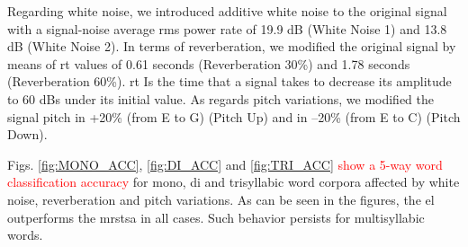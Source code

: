 \documentclass[10pt,letterpaper]{article}
\begin{document}
\pagebreak

Regarding white noise, we introduced additive white noise to the original signal with a signal-noise average \gls{rms} power rate of 19.9 dB (White Noise 1) and 13.8 dB (White Noise 2). In terms of reverberation, we modified the original signal by means of \gls{rt} values of 0.61 seconds (Reverberation 30\%) and 1.78 seconds (Reverberation 60\%). \gls{rt} Is the time that a signal takes to decrease its amplitude to 60 dBs under its initial value. As regards pitch variations, we modified the signal pitch in +20\% (from E to G) (Pitch Up) and in --20\% (from E to C) (Pitch Down).

Figs. \ref{fig:MONO_ACC}, \ref{fig:DI_ACC} and \ref{fig:TRI_ACC}
\textcolor{red}{show a 5-way word classification accuracy} for mono, di and trisyllabic word corpora affected by
white noise, reverberation and pitch variations.
As can be seen in the figures, the \gls{el} outperforms the \gls{mrstsa} in all cases.
Such behavior persists for multisyllabic words.
\end{document}
